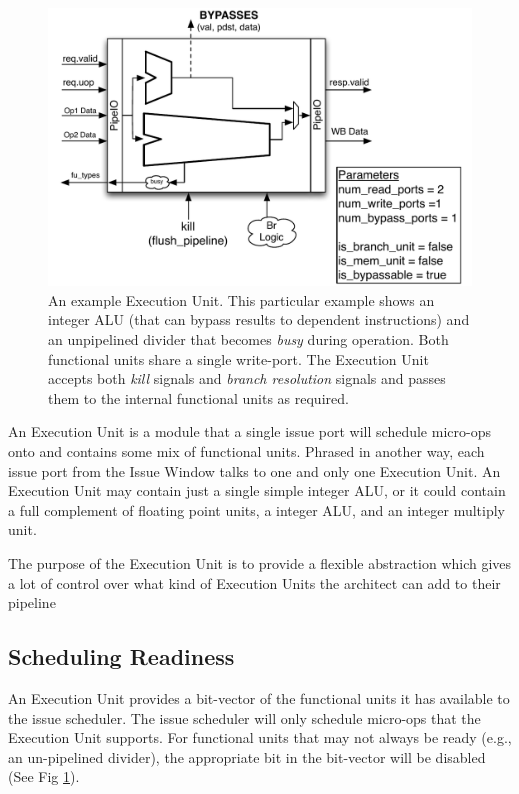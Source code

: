 \begin{figure}[htbp]
	\centering
	\centerline{\includegraphics[scale =0.8] {figures/execution-unit}}
	\caption{ \small An example Execution Unit. This particular example shows an integer ALU (that can bypass results to dependent instructions) and an unpipelined divider that becomes {\em busy} during operation. Both functional units share a single write-port.  The Execution Unit accepts both {\em kill} signals and {\em branch resolution} signals and passes them to the internal functional units as required.}
	\label{fig:execute-unit}
\end{figure}


An Execution Unit is a module that a single issue port will schedule micro-ops onto and contains some mix of functional units.  Phrased in another way, each issue port from the Issue Window talks to one and only one Execution Unit. An Execution Unit may contain just a single simple integer ALU, or it could contain a full complement of floating point units, a integer ALU, and an integer multiply unit.  

The purpose of the Execution Unit is to provide a flexible abstraction which gives a lot of control over what kind of Execution Units the architect can add to their pipeline

\subsection{Scheduling Readiness}

An Execution Unit provides a bit-vector of the functional units it has available to the issue scheduler. The issue scheduler will only schedule micro-ops that the Execution Unit supports.  For functional units that may not always be ready (e.g., an un-pipelined divider), the appropriate bit in the bit-vector will be disabled (See Fig \ref{fig:execute-unit}).



